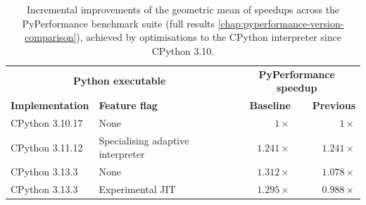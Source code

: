 \begin{table}[H]
  \caption{Incremental improvements of the geometric mean of speedups across the PyPerformance benchmark suite (full results \autoref{chap:pyperformance-version-comparison}), achieved by optimisations to the CPython interpreter since CPython 3.10.}
  \label{tab:faster-cpython}
  \centering
  \begin{tabular}{llrr}
    \toprule
    \multicolumn{2}{c}{\textbf{Python executable}} & \multicolumn{2}{c}{\textbf{PyPerformance speedup}}\\
    \cmidrule(r){1-2} \cmidrule(r){3-4}
    \textbf{Implementation} & \textbf{Feature flag} & \textbf{Baseline} & \textbf{Previous} \\
    \midrule
    CPython 3.10.17 & None & $1\times$ & $1\times$ \\
    CPython 3.11.12 & Specialising adaptive interpreter & $1.241\times$ & $1.241\times$ \\
    CPython 3.13.3 & None & $1.312\times$ & $1.078\times$ \\
    CPython 3.13.3 & Experimental JIT & $1.295\times$ & $0.988\times$ \\
    \bottomrule
  \end{tabular}
\end{table}

